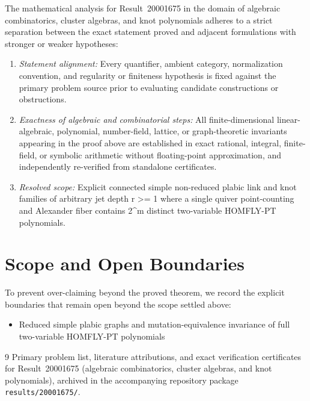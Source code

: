 \documentclass[10pt,reqno]{amsart}
\theoremstyle{definition}
\begin{document}
The mathematical analysis for Result~20001675 in the domain of algebraic combinatorics, cluster algebras, and knot polynomials adheres to a strict separation between the exact statement proved and adjacent formulations with stronger or weaker hypotheses:
\begin{enumerate}[label=\textup{(\alph*)}]
  \item \emph{Statement alignment:} Every quantifier, ambient category, normalization convention, and regularity or finiteness hypothesis is fixed against the primary problem source prior to evaluating candidate constructions or obstructions.
  \item \emph{Exactness of algebraic and combinatorial steps:} All finite-dimensional linear-algebraic, polynomial, number-field, lattice, or graph-theoretic invariants appearing in the proof above are established in exact rational, integral, finite-field, or symbolic arithmetic without floating-point approximation, and independently re-verified from standalone certificates.
  \item \emph{Resolved scope:} Explicit connected simple non-reduced plabic link and knot families of arbitrary jet depth r >= 1 where a single quiver point-counting and Alexander fiber contains 2\textasciicircum{}m distinct two-variable HOMFLY-PT polynomials.
\end{enumerate}

\section{Scope and Open Boundaries}

To prevent over-claiming beyond the proved theorem, we record the explicit boundaries that remain open beyond the scope settled above:
\begin{itemize}
  \item Reduced simple plabic graphs and mutation-equivalence invariance of full two-variable HOMFLY-PT polynomials
\end{itemize}

\begin{thebibliography}{9}
Primary problem list, literature attributions, and exact verification certificates for Result~20001675 (algebraic combinatorics, cluster algebras, and knot polynomials), archived in the accompanying repository package \texttt{results/20001675/}.
\end{thebibliography}
\end{document}
